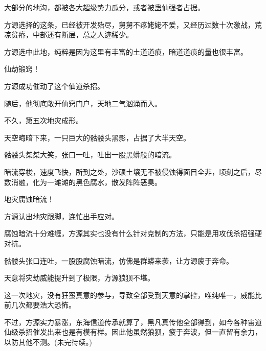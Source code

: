 \begin{this_body}
大部分的地沟，都被各大超级势力瓜分，或者被蛊仙强者占据。

方源选择的这条，已经被开发殆尽，舅舅不疼姥姥不爱，又经历过数十次激战，荒凉贫瘠，中部还有断层，总之人迹稀少。

方源选中此地，纯粹是因为这里有丰富的土道道痕，暗道道痕的量也很丰富。

仙劫锻窍！

方源成功催动了这个仙道杀招。

随后，他彻底敞开仙窍门户，天地二气汹涌而入。

不久，第五次地灾成形。

天空晦暗下来，一只巨大的骷髅头黑影，占据了大半天空。

骷髅头桀桀大笑，张口一吐，吐出一股黑蟒般的暗流。

暗流穿梭，速度飞快，所到之处，沙硕土壤无不被侵蚀得面目全非，顷刻之后，尽数消融，化为一滩滩的黑色腐水，散发阵阵恶臭。

地灾腐蚀暗流！

方源认出地灾跟脚，连忙出手应对。

腐蚀暗流十分难缠，方源其实也没有什么针对克制的方法，只能是用攻伐杀招强硬对抗。

骷髅头张口连吐，一股股腐蚀暗流，仿佛是群蟒来袭，让方源疲于奔命。

天意将灾劫威能提升到了极限，方源狼狈不堪。

这一次地灾，没有狂蛮真意的参与，导致全部受到天意的掌控，唯纯唯一，威能比前几次都要浩大恐怖。

不过，方源实力暴涨，东海信道传承就算了，黑凡真传他全部得到，如今各种宙道仙级杀招催发出来也是有模有样。因此他虽然狼狈，疲于奔波，但一直留有余力，以防其他不测。(未完待续。)

\end{this_body}

